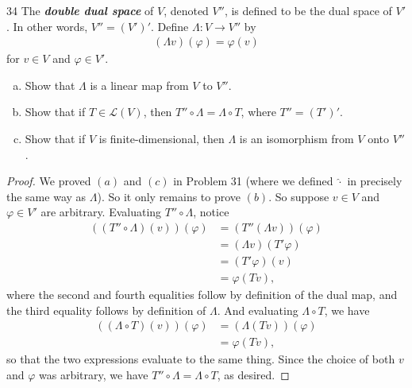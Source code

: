 \documentclass[11pt]{extarticle}
\newenvironment{problem}[1]{\begin{prob*}{#1}{}}{\end{prob*}}
\newcommand{\Hom}{\mathcal{L}}
\begin{document}
\begin{problem}{34}
The \textbf{\textit{double dual space}} of $V$, denoted $V''$, is defined to be the dual space of $V'$.  In other words, $V'' = (V')'$.  Define $\Lambda:V\to V''$ by
\begin{align*}
(\Lambda v)(\varphi)=\varphi(v)
\end{align*}
for $v\in V$ and $\varphi\in V'$.  
\begin{enumerate}[(a)]
\item Show that $\Lambda$ is a linear map from $V$ to $V''$.
\item Show that if $T\in\Hom(V)$, then $T''\circ\Lambda = \Lambda\circ T$, where $T'' = (T')'$.
\item Show that if $V$ is finite-dimensional, then $\Lambda$ is an isomorphism from $V$ onto $V''$.
\end{enumerate}
\end{problem}
\begin{proof}
We proved $(a)$ and $(c)$ in Problem 31 (where we defined $\hat{\cdot}$ in precisely the same way as $\Lambda$).  So it only remains to prove $(b)$.  So suppose $v\in V$ and $\varphi\in V'$ are arbitrary.  Evaluating $T''\circ\Lambda$, notice
\begin{align*}
((T''\circ\Lambda)(v))(\varphi) &= (T''(\Lambda v))(\varphi)\\
&= (\Lambda v)(T'\varphi)\\
&= (T'\varphi)(v)\\
&= \varphi(Tv),
\end{align*}
where the second and fourth equalities follow by definition of the dual map, and the third equality follows by definition of $\Lambda$.  And evaluating $\Lambda\circ T$, we have
\begin{align*}
((\Lambda\circ T)(v))(\varphi) &= (\Lambda(Tv))(\varphi)\\
&= \varphi(Tv),
\end{align*}
so that the two expressions evaluate to the same thing.  Since the choice of both $v$ and $\varphi$ was arbitrary, we have $T''\circ\Lambda = \Lambda\circ T$, as desired.
\end{proof}
\end{document}
